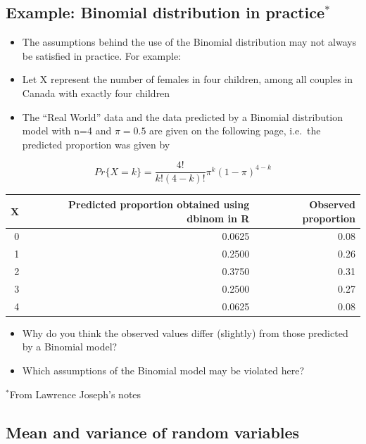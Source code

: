\documentclass[
]{book}
\providecommand{\tightlist}{%
  \setlength{\itemsep}{0pt}\setlength{\parskip}{0pt}}
\begin{document}
\hypertarget{example-binomial-distribution-in-practice}{%
\subsection{\texorpdfstring{Example: Binomial distribution in practice\(^*\)}{Example: Binomial distribution in practice\^{}*}}\label{example-binomial-distribution-in-practice}}

\begin{itemize}
\tightlist
\item
  The assumptions behind the use of the Binomial distribution may not always be satisfied in practice. For example:
\item
  Let X represent the number of females in four children, among all couples in Canada with exactly four children
\item
  The ``Real World'' data and the data predicted by a Binomial distribution model with n=4 and \(\pi=0.5\) are given on the following page, i.e.~the predicted proportion was given by
\end{itemize}

\[Pr\{X=k\} = \frac{4!}{k!(4-k)!}\pi^k(1-\pi)^{4-k}\]

\begin{tabular}{r|r|r}
\hline
X & Predicted proportion obtained using dbinom in R & Observed proportion\\
\hline
0 & 0.0625 & 0.08\\
\hline
1 & 0.2500 & 0.26\\
\hline
2 & 0.3750 & 0.31\\
\hline
3 & 0.2500 & 0.27\\
\hline
4 & 0.0625 & 0.08\\
\hline
\end{tabular}

\begin{itemize}
\tightlist
\item
  Why do you think the observed values differ (slightly) from those predicted by a Binomial model?
\item
  Which assumptions of the Binomial model may be violated here?
\end{itemize}

\(^*\)From Lawrence Joseph's notes

\hypertarget{mean-and-variance-of-random-variables}{%
\subsection{Mean and variance of random variables}\label{mean-and-variance-of-random-variables}}
\end{document}
